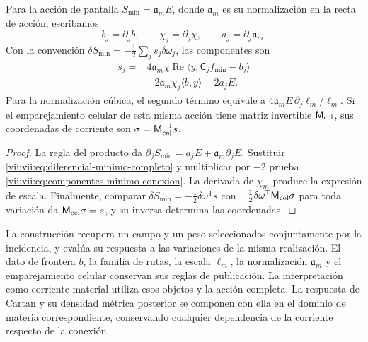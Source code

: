 \begin{theorem}
\label{vii:vii:thm:componentes-minimo-conexion}
Para la acción de pantalla
\(S_{\min}=\mathfrak a_m E\), donde \(\mathfrak a_m\) es su
normalización en la recta de acción, escribamos
\[
 b_j=\partial_jb,\qquad \chi_j=\partial_j\chi,
 \qquad a_j=\partial_j\mathfrak a_m.
\]
Con la convención \(\delta S_{\min}=-\tfrac12\sum_j s_j\delta\omega_j\),
las componentes son
\begin{equation}
 \begin{split}
 s_j={}&4\mathfrak a_m\chi\operatorname{Re}
             \langle y,\mathsf C_jf_{\min}-b_j\rangle\\
      &-2\mathfrak a_m\chi_j\langle b,y\rangle-2a_jE.
 \end{split}
 \label{vii:vii:eq:componentes-minimo-conexion}
\end{equation}
Para la normalización cúbica, el segundo término equivale a
\(4\mathfrak a_m E\,\partial_j\ell_m/\ell_m\).
Si el emparejamiento celular de esta misma acción tiene matriz
invertible \(\mathsf M_{\rm cel}\), sus coordenadas de corriente
son \(\sigma=\mathsf M_{\rm cel}^{-1}s\).
\end{theorem}

\begin{proof}
La regla del producto da
\(\partial_jS_{\min}=a_jE+\mathfrak a_m\partial_jE\).
Sustituir \eqref{vii:vii:eq:diferencial-minimo-completo} y multiplicar
por \(-2\) prueba \eqref{vii:vii:eq:componentes-minimo-conexion}.
La derivada de \(\chi_m\) produce la expresión de escala.
Finalmente, comparar
\(\delta S_{\min}=-\tfrac12\delta\omega^{\mathsf T}s\)
con \(-\tfrac12\delta\omega^{\mathsf T}\mathsf M_{\rm cel}\sigma\)
para toda variación da \(\mathsf M_{\rm cel}\sigma=s\),
y su inversa determina las coordenadas.
\end{proof}

La construcción recupera un campo y un peso seleccionados conjuntamente
por la incidencia, y evalúa su respuesta a las variaciones de la misma
realización. El dato de frontera \(b\), la familia de rutas, la escala
\(\ell_m\), la normalización \(\mathfrak a_m\) y el emparejamiento
celular conservan sus reglas de publicación. La interpretación como
corriente material utiliza esos objetos y la acción completa. La
respuesta de Cartan y su densidad métrica posterior se componen con
ella en el dominio de materia correspondiente, conservando cualquier
dependencia de la corriente respecto de la conexión.
